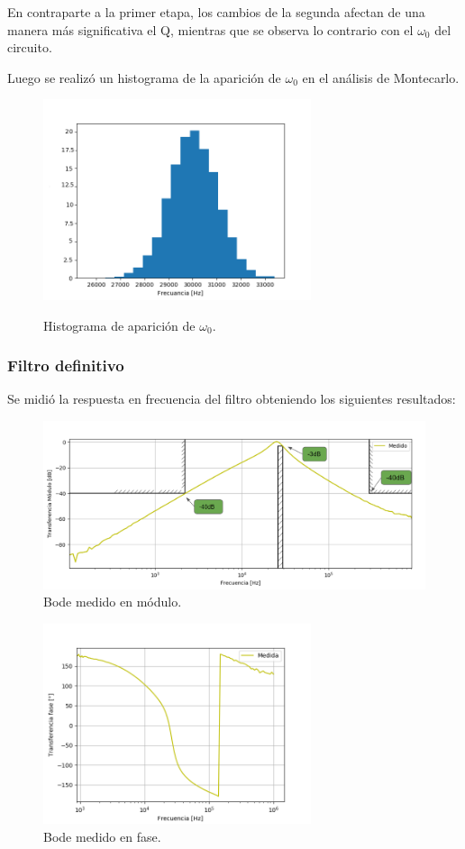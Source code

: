 En contraparte a la primer etapa, los cambios de la segunda afectan de una manera más significativa el Q, mientras que se observa lo contrario con el $\omega_0$ del circuito.

Luego se realizó un histograma de la aparición de $\omega_0$ en el análisis de Montecarlo.
\begin{figure}[H]
	\centering
	\includegraphics[width=0.7\textwidth]{Imagenes-Ej2/histW0.png}
	\label{fig:graph}
	\caption{Histograma de aparición de $\omega_0$.}
\end{figure}

\subsubsection{Filtro definitivo}
Se midió la respuesta en frecuencia del filtro obteniendo los siguientes resultados:
\begin{figure}[H]
	\centering
	\includegraphics[width=\textwidth]{Imagenes-Ej2/BodeRauch.png}
	\caption{Bode medido en módulo.}
	\label{fig:bodemm}
\end{figure}
\begin{figure}[H]
	\centering
	\includegraphics[width=0.7\textwidth]{Imagenes-Ej2/BodeRauchFase.png}
	\caption{Bode medido en fase.}
	\label{fig:bodemf}
\end{figure}

